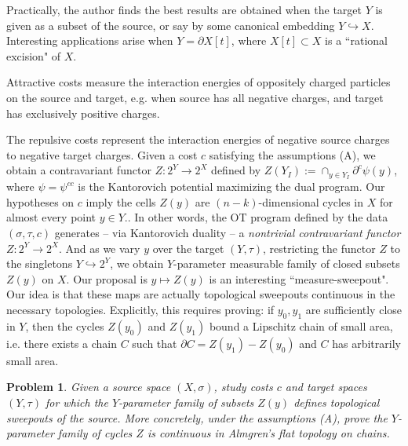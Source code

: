 \documentclass[12pt]{amsart}
\newtheorem{prob}{Problem}
\theoremstyle{definition}
\theoremstyle{remark}
\newcommand{\del}{\partial}
\newcommand{\sub}{\del^c \psi(y)}
\begin{document}

Practically, the author finds the best results are obtained when the target $Y$ is given as a subset of the source, or say by some canonical embedding $Y\hookrightarrow X$. Interesting applications arise when $Y=\del X[t]$, where $X[t] \subset X$ is a ``rational excision" of $X$. 

Attractive costs measure the interaction energies of oppositely charged particles on the source and target, e.g. when source has all negative charges, and target has exclusively positive charges. 

The repulsive costs represent the interaction energies of negative source charges to negative target charges. Given a cost $c$ satisfying the assumptions (A), we obtain a contravariant functor $Z: 2^Y \to 2^X$ defined by $Z(Y_I):=\cap_{y\in Y_I} \sub$, where $\psi=\psi^{cc}$ is the Kantorovich potential maximizing the dual program. Our hypotheses on $c$ imply the cells $Z(y)$ are $(n-k)$-dimensional cycles in $X$ for almost every point $y\in Y$.. In other words, the OT program defined by the data $(\sigma, \tau, c)$ generates -- via Kantorovich duality -- a \emph{nontrivial contravariant functor} $Z: 2^Y \to 2^X$. And as we vary $y$ over the target $(Y, \tau)$, restricting the functor $Z$ to the singletons $Y \hookrightarrow 2^Y$, we obtain $Y$-parameter measurable family of closed subsets $Z(y)$ on $X$. Our proposal is $y\mapsto Z(y)$ is an interesting ``measure-sweepout". Our idea is that these maps are actually topological sweepouts continuous in the necessary topologies. Explicitly, this requires proving: if $y_0, y_1$ are sufficiently close in $Y$, then the cycles $Z(y_0)$ and $Z(y_1)$ bound a Lipschitz chain of small area, i.e. there exists a chain $C$ such that $\del C = Z(y_1)-Z(y_0)$ and $C$ has arbitrarily small area.


\begin{prob}
\label{alm}
Given a source space $(X, \sigma)$, study costs $c$ and target spaces $(Y, \tau)$ for which the $Y$-parameter family of subsets $Z(y)$ defines topological sweepouts of the source. More concretely, under the assumptions (A), prove the $Y$-parameter family of cycles $Z$ is continuous in Almgren's flat topology on chains. 
\end{prob}
\end{document}
